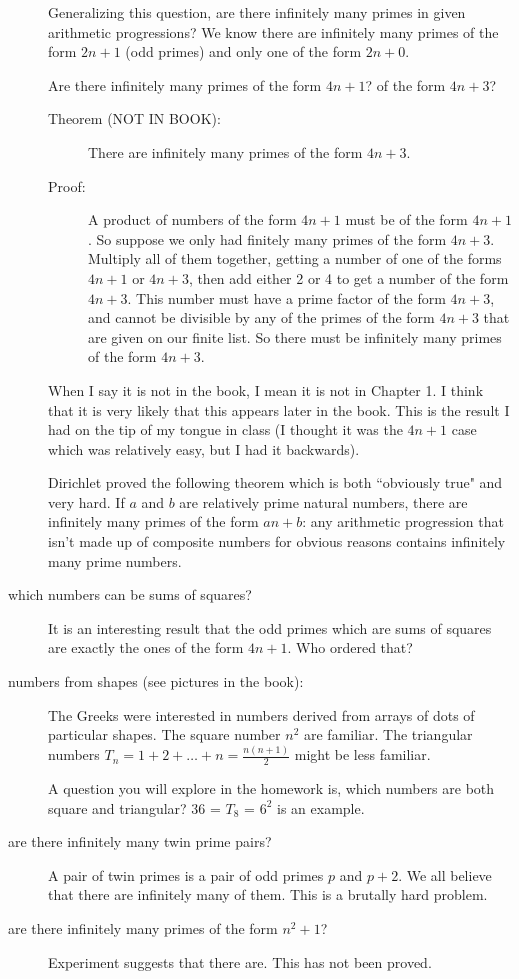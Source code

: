 \documentclass[12pt]{article}
\begin{document}
\begin{description}
Generalizing this question, are there infinitely many primes in given arithmetic progressions?  We know there are infinitely many primes of the form $2n+1$ (odd primes) and only one of the form $2n+0$.

Are there infinitely many primes of the form $4n+1$?  of the form $4n+3$?

\begin{description}

\item[Theorem (NOT IN BOOK):]  There are infinitely many primes of the form $4n+3$.

\item[Proof:]   A product of numbers of the form $4n+1$ must be of the form $4n+1$.   So suppose we only had finitely many primes of the form $4n+3$.   Multiply all of them together, getting a number of one of the forms $4n+1$ or $4n+3$, then add either 2 or 4  to get a number of the form $4n+3$.
This number must have a prime factor of the form $4n+3$, and cannot be divisible by any of the primes of the form $4n+3$ that are given on our finite list.   So there must be infinitely many primes of the form $4n+3$.


\end{description}

When I say it is not in the book, I mean it is not in Chapter 1.  I think that it is very likely that this appears later in the book.  This is the result I had on the tip of my tongue in class (I thought it was the $4n+1$ case which was relatively easy, but I had it backwards).

Dirichlet proved the following theorem which is both ``obviously true" and very hard.  If $a$ and $b$ are relatively prime natural numbers, there are infinitely many primes of the form $an+b$:  any arithmetic progression that isn't made up of composite numbers for obvious reasons contains infinitely many prime numbers.

\item[which numbers can be sums of squares?]  It is an interesting result that the odd primes which are sums of squares
are exactly the ones of the form $4n+1$.   Who ordered that?

\item[numbers from shapes (see pictures in the book):]   The Greeks were interested in numbers derived from arrays of dots of particular shapes.   The square number $n^2$ are familiar.   The triangular numbers $T_n = 1+2+\ldots+n = \frac{n(n+1)}2$ might be less familiar.

A question you will explore in the homework is, which numbers are both square and triangular?  36 = $T_8$ = $6^2$ is an example.

\item[are there infinitely many twin prime pairs?]  A pair of twin primes is a pair of odd primes $p$ and $p+2$.   We all believe that there are infinitely many of them.   This is a brutally hard problem.

\item[are there infinitely many primes of the form $n^2+1$?]   Experiment suggests that there are.   This has not been proved.

\end{description}
\end{document}

